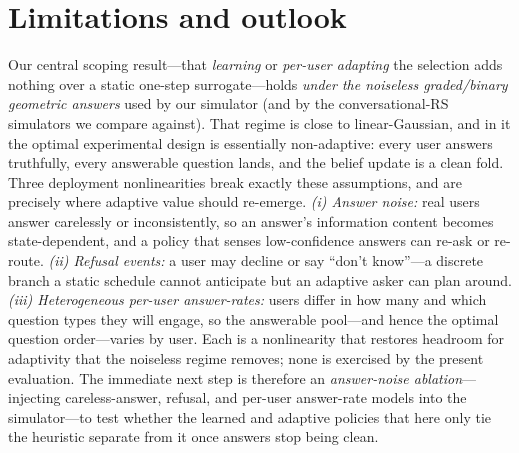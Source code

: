 \documentclass[11pt]{article}
\begin{document}
\section{Limitations and outlook}\label{sec:limits}
Our central scoping result---that \emph{learning} or \emph{per-user adapting} the selection adds nothing over a static
one-step surrogate---holds \emph{under the noiseless graded/binary geometric answers} used by our simulator (and by the
conversational-RS simulators we compare against). That regime is close to linear-Gaussian, and in it the optimal
experimental design is essentially non-adaptive: every user answers truthfully, every answerable question lands, and the
belief update is a clean fold. Three deployment nonlinearities break exactly these assumptions, and are precisely where
adaptive value should re-emerge. \emph{(i) Answer noise:} real users answer carelessly or inconsistently, so an answer's
information content becomes state-dependent, and a policy that senses low-confidence answers can re-ask or re-route.
\emph{(ii) Refusal events:} a user may decline or say ``don't know''---a discrete branch a static schedule cannot
anticipate but an adaptive asker can plan around. \emph{(iii) Heterogeneous per-user answer-rates:} users differ in how
many and which question types they will engage, so the answerable pool---and hence the optimal question order---varies by
user. Each is a nonlinearity that restores headroom for adaptivity that the noiseless regime removes; none is exercised
by the present evaluation. The immediate next step is therefore an \emph{answer-noise ablation}---injecting
careless-answer, refusal, and per-user answer-rate models into the simulator---to test whether the learned and adaptive
policies that here only tie the heuristic separate from it once answers stop being clean.
\end{document}
